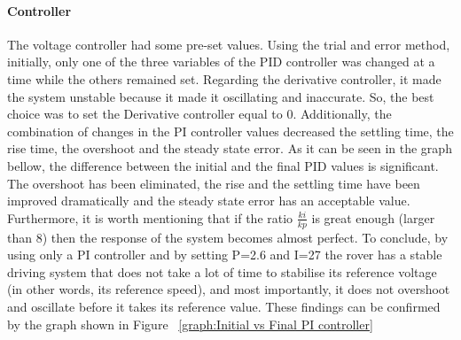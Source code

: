 \documentclass[a4paper]{article}
\begin{document}




\paragraph*{Controller}
\vspace{-6pt}
The voltage controller had some pre-set values. Using the trial and error method, 
initially,  only one of the three variables of the PID controller was changed at 
a time while the others remained set. Regarding the derivative controller, it 
made the system unstable because it made it oscillating and inaccurate. So, 
the best choice was to set the Derivative controller equal to 0. Additionally, 
the combination of changes in the PI controller values decreased the settling 
time, the rise time, the overshoot and the steady state error. As it can be seen 
in the graph bellow, the difference between the initial and the final PID values 
is significant. The overshoot has been eliminated, the rise and the settling 
time have been improved dramatically and the steady state error has an acceptable 
value. Furthermore, it is worth mentioning that if the ratio  \( \frac{ki}{kp} \)  
is great enough (larger than 8) then the response of the system becomes almost 
perfect.
To conclude, by using only a PI controller and by setting P=2.6 and I=27 the 
rover has a stable driving system that does not take a lot of time to stabilise 
its reference voltage (in other words, its reference speed), and most importantly, 
it does not overshoot and oscillate before it takes its reference value. 
These findings can be confirmed by the graph shown in Figure ~\ref{graph:Initial vs Final PI controller}

\end{document}
